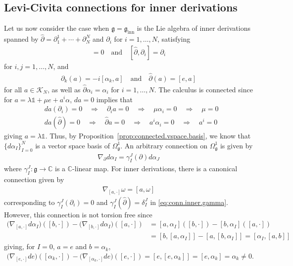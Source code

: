 \documentclass{amsart}
\newcommand{\complex}{\mathbb{C}}
\newcommand{\paraa}[1]{\big(#1\big)}
\newcommand{\spacearound}[1]{\quad#1\quad}
\renewcommand{\implies}{\spacearound{\Rightarrow}}
\theoremstyle{definition}
\theoremstyle{remark}
\numberwithin{equation}{section}
\newcommand{\K}{\mathcal{K}}
\renewcommand{\mid}{\mathds{1}}
\newcommand{\KN}{\K_N}
\renewcommand{\d}{\partial}
\newcommand{\qand}{\quad\text{and}\quad}
\newcommand{\g}{\mathfrak{g}}
\newcommand{\ginn}{\g_{\textrm{inn}}}
\renewcommand{\dh}{\hat{\partial}}
\newcommand{\Omegaoneg}{\Omega^1_{\g}}
\begin{document}
\subsection{Levi-Civita connections for inner derivations}
Let us now consider the case when $\g=\ginn$ is the Lie algebra of inner
derivations spanned by $\dh=\d_1^1+\cdots+\d_N^N$ and $\d_i$ for $i=1,\ldots,N$, satisfying
\begin{align*}
  [\d_i,\d_j]=0\qand
  [\dh,\d_i] = \d_i
\end{align*}
for $i,j=1,\ldots,N$, and
\begin{align*}
  \d_k(a) = -i[\alpha_k,a]\qand
  \dh(a) = [e,a]
\end{align*}
for all $a\in\KN$, as well as $\dh\alpha_i=\alpha_i$ for
$i=1,\ldots,N$. The calculus is connected since for
$a=\lambda\mid + \mu e + a^i\alpha$, $da=0$ implies that
\begin{align*}
  &da(\d_i) = 0\implies \d_ia = 0 \implies \mu\alpha_i = 0\implies\mu = 0\\
  &da(\dh) = 0 \implies \dh a = 0\implies a^i\alpha_i = 0 \implies a^i = 0
\end{align*}
giving $a=\lambda\mid$. Thus, by
Proposition~\ref{prop:connected.vspace.basis}, we know that
$\{d\alpha_I\}_{I=0}^N$ is a vector space basis of $\Omegaoneg$.
An arbitrary connection on $\Omegaoneg$ is given by
\begin{align}\label{eq:conn.inner.gamma}
  \nabla_{\d}d\alpha_I = \gamma_I^J(\d)d\alpha_J
\end{align}
where $\gamma_I^J:\g\to\complex$ is a $\complex$-linear map. For inner
derivations, there is a canonical connection given by
\begin{align*}
  \nabla_{[a,\cdot]}\omega = [a,\omega]
\end{align*}
corresponding to $\gamma_I^J(\d_i)=0$ and $\gamma_I^J(\dh)=\delta_I^J$
in \eqref{eq:conn.inner.gamma}. However, this connection is not
torsion free since
\begin{align*}
  \paraa{\nabla_{[a,\cdot]}d\alpha_I}([b,\cdot]) -\paraa{\nabla_{[b,\cdot]}d\alpha_I}([a,\cdot])
  &= [a,\alpha_I]([b,\cdot])-[b,\alpha_I]([a,\cdot])\\
  &= [b,[a,\alpha_I]]-[a,[b,\alpha_I]]
    =[\alpha_I,[a,b]]
\end{align*}
giving, for $I=0$, $a=e$ and $b=\alpha_k$,
\begin{align*}
  \paraa{\nabla_{[e,\cdot]}de}([\alpha_k,\cdot]) -\paraa{\nabla_{[\alpha_k,\cdot]}de}([e,\cdot])
  =[e,[e,\alpha_k]] = [e,\alpha_k] = \alpha_k \neq 0.
\end{align*}
\end{document}
